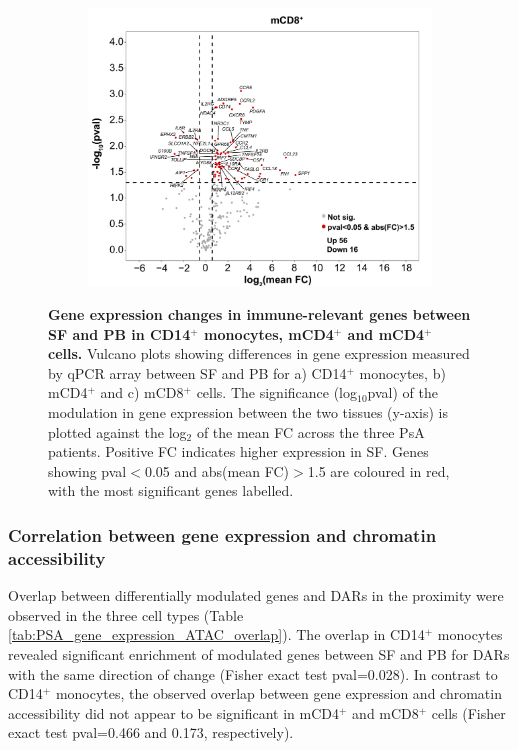 \begin{figure}[htbp]
\begin{subfigure}{0.5\textwidth}
\caption{\textbf{}}
\end{subfigure} %
\begin{subfigure}{0.5\textwidth}
\centering
\includegraphics[width=\textwidth]{./Results3/pdfs/PSA_CD8_vulcano_plot_PCR_array_mean_FC}
\caption{\textbf{}}
\end{subfigure}
\caption[Gene expression changes in immune-relevant genes between SF and PB in CD14$^+$ monocytes, mCD4$^+$ and mCD8$^+$ cells.]{\textbf{Gene expression changes in immune-relevant genes between SF and PB in CD14$^+$ monocytes, mCD4$^+$ and mCD4$^+$ cells.} Vulcano plots showing differences in gene expression measured by qPCR array between SF and PB for a) CD14$^+$ monocytes, b) mCD4$^+$ and c) mCD8$^+$ cells. The significance (log${_10}$pval) of the modulation in gene expression between the two tissues (y-axis) is plotted against the log${_2}$ of the mean FC across the three PsA patients. Positive FC indicates higher expression in SF. Genes showing pval$<$0.05 and abs(mean FC)$>$1.5 are coloured in red, with the most significant genes labelled.}
\label{figure:PSA_PCR_array_vulcano_plots}
\end{figure} 




\subsubsection{Correlation between gene expression and chromatin accessibility}
Overlap between differentially modulated genes and DARs in the proximity were observed in the three cell types (Table \ref{tab:PSA_gene_expression_ATAC_overlap}). The overlap in CD14$^+$ monocytes revealed significant enrichment of modulated genes between SF and PB for DARs with the same direction of change (Fisher exact test pval=0.028). In contrast to CD14$^+$ monocytes, the observed overlap between gene expression and chromatin accessibility did not appear to be significant in mCD4$^+$ and mCD8$^+$ cells (Fisher exact test pval=0.466 and 0.173, respectively).


